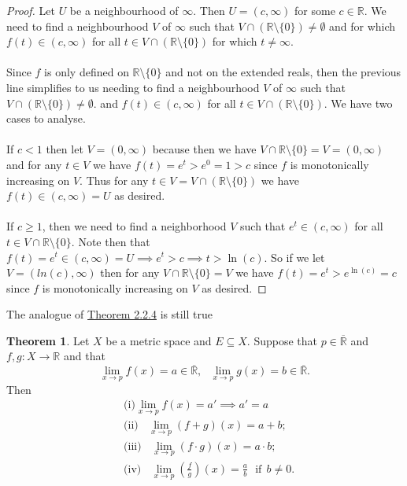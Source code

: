 \documentclass[12pt]{article}
\theoremstyle{definition}
\numberwithin{definition}{subsection}
\newtheorem{theorem}{Theorem}
\numberwithin{theorem}{subsection}
\numberwithin{corollary}{subsection}
\numberwithin{example}{subsection}
\theoremstyle{remark}
\theoremstyle{point}
\newcommand{\R}{\mathbb{R}}
\begin{document}
	 \begin{proof}
	 	Let $U$ be a neighbourhood of $\infty$. Then $U = (c, \infty)$ for some $c \in \R$. We need to find a neighbourhood $V$ of $\infty$ such that $V \cap\left(  \R \setminus \{0\}\right) \neq \emptyset $ and for which $f(t) \in (c, \infty)$ for all $t \in V \cap\left(  \R \setminus \{0\}\right) $ for which $t \neq \infty$. \\ \\
	 	Since $f$ is only defined on $\R \setminus \{0\}$ and not on the extended reals, then the  previous line simplifies to us needing to find a neighbourhood $V$ of $\infty$ such that $V \cap\left(  \R \setminus \{0\}\right) \neq \emptyset $. and $f(t) \in (c, \infty)$ for all $t \in V \cap\left(  \R \setminus \{0\}\right) $.  We have two cases to analyse.\\ \\
	 	If $c < 1$ then let $V = (0, \infty)$ because then we have $V \cap \R \setminus \{0\} = V = (0, \infty)$ and for any $t \in V$ we have $f(t) = e^t > e^0 = 1 > c$ since $f$ is monotonically increasing on $V$. Thus for any $t \in V = V \cap\left(  \R \setminus \{0\}\right)$ we have $f(t) \in (c, \infty) = U$ as desired. \\ \\
	 	If $ c \geq 1$, then we need to find a neighborhood $V$ such that $e^t \in (c, \infty)$ for all $t \in V \cap \R \setminus \{0\}$. Note then that $f(t) = e^t \in (c, \infty) = U \implies e^t > c \implies t > \ln(c)$. So if we let $V = (ln(c), \infty)$ then for any $V \cap \R \setminus \{0\} = V$ we have $f(t) = e^t > e^{\ln(c)} = c$ since $f$ is monotonically increasing on $V$ as desired.
	 \end{proof}
	 
	 
	 
	 The analogue of \hyperlink{limit-thm}{Theorem 2.2.4} is still true 
	 
	 \begin{theorem}
	 		Let $X$ be a metric space and $E \subseteq X$. Suppose that $p \in \overline{\R}$ and $f, g : X \to \mathbb{R}$ and that $$\lim_{x \to p} f(x) = a \in \overline{\R}, \ \ \ \lim_{x \to p} g(x) = b \in \overline{\R}.$$Then  	
	 		\begin{align*}
	 		&\text{(i)} \lim_{x \to p} f(x) = a' \implies a' = a\\
	 		&\text{(ii)} \ \  \ \ \lim_{x \to p}(f+g)(x) = a + b; \\
	 		&\text{(iii)} \ \  \ \ \lim_{x \to p}(f\cdot g)(x) = a \cdot b; \\
	 		&\text{(iv)} \ \  \ \ \lim_{x \to p}\left( \frac{f}{g}\right) (x) = \frac{a}{b} \ \ \ \text{if} \ \ b\neq 0.
	 		\end{align*}	 		
	 \end{theorem}
	 
\end{document}
